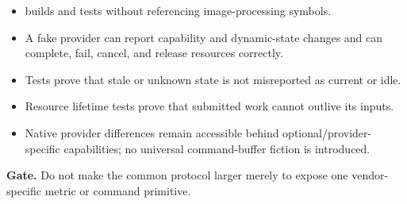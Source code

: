 \exitcriteria
\begin{itemize}
  \item \GEP{} builds and tests without referencing image-processing symbols.
  \item A fake provider can report capability and dynamic-state changes and can complete, fail, cancel, and release resources correctly.
  \item Tests prove that stale or unknown state is not misreported as current or idle.
  \item Resource lifetime tests prove that submitted work cannot outlive its inputs.
  \item Native provider differences remain accessible behind optional/provider-specific capabilities; no universal command-buffer fiction is introduced.
\end{itemize}

\textbf{Gate.} Do not make the common protocol larger merely to expose one vendor-specific metric or command primitive.